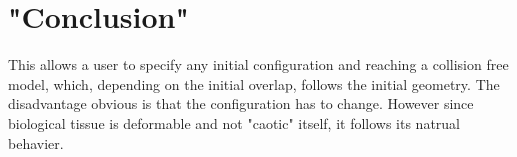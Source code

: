 % 
% 
% 
% 
% 
% 
% 
%
% 
\section{"Conclusion"}
This allows a user to specify any initial configuration and reaching a collision free model, which, depending on the initial overlap, follows the initial geometry.
The disadvantage obvious is that the configuration has to change.
However since biological tissue is deformable and not "caotic" itself, it follows its natrual behavier.